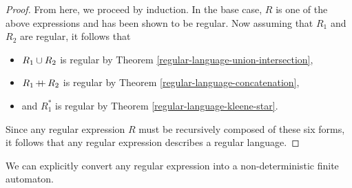 \begin{proof}
    From here, we proceed by induction. In the base case, $R$ is one of the above expressions and has been shown to be regular. Now assuming that $R_1$ and $R_2$ are regular, it follows that
    \begin{itemize}
        \item $R_1 \cup R_2$ is regular by Theorem \ref{regular-language-union-intersection},
        \item $R_1 \kern-0.2ex+\kern-1.5ex+\kern0.4ex R_2$ is regular by Theorem \ref{regular-language-concatenation},
        \item and $R_1^{*}$ is regular by Theorem \ref{regular-language-kleene-star}.
    \end{itemize}
    Since any regular expression $R$ must be recursively composed of these six forms, it follows that any regular expression describes a regular language.
\end{proof}

\begin{rmk}
    We can explicitly convert any regular expression into a non-deterministic finite automaton.
\end{rmk}

